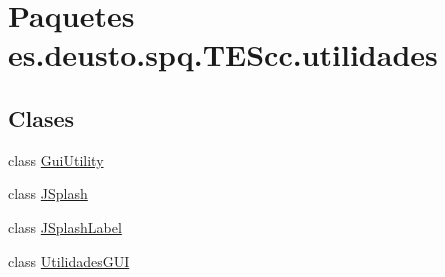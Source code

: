 \hypertarget{namespacees_1_1deusto_1_1spq_1_1_t_e_scc_1_1utilidades}{\section{Paquetes es.\+deusto.\+spq.\+T\+E\+Scc.\+utilidades}
\label{namespacees_1_1deusto_1_1spq_1_1_t_e_scc_1_1utilidades}
}
\subsection*{Clases}
\begin{DoxyCompactItemize}
\item 
class \hyperlink{classes_1_1deusto_1_1spq_1_1_t_e_scc_1_1utilidades_1_1_gui_utility}{Gui\+Utility}
\item 
class \hyperlink{classes_1_1deusto_1_1spq_1_1_t_e_scc_1_1utilidades_1_1_j_splash}{J\+Splash}
\item 
class \hyperlink{classes_1_1deusto_1_1spq_1_1_t_e_scc_1_1utilidades_1_1_j_splash_label}{J\+Splash\+Label}
\item 
class \hyperlink{classes_1_1deusto_1_1spq_1_1_t_e_scc_1_1utilidades_1_1_utilidades_g_u_i}{Utilidades\+G\+U\+I}
\end{DoxyCompactItemize}
